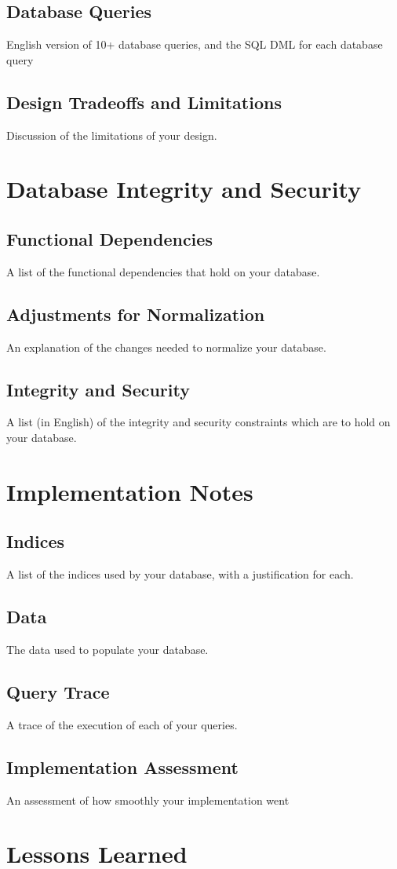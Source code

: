 \documentclass[11pt, a4paper]{report}
\begin{document}
\section{Database Queries}
    English version of 10+ database queries, and the SQL DML for each database query
\section{Design Tradeoffs and Limitations}
    Discussion of the limitations of your design.

\chapter{Database Integrity and Security}
\section{Functional Dependencies}
    A list of the functional dependencies that hold on your database.
\section{Adjustments for Normalization}
    An explanation of the changes needed to normalize your database.
\section{Integrity and Security}
    A list (in English) of the integrity and security constraints which are to hold on your database.

\chapter{Implementation Notes}
\section{Indices}
    A list of the indices used by your database, with a justification for each.
\section{Data}
    The data used to populate your database.
\section{Query Trace}
    A trace of the execution of each of your queries.
\section{Implementation Assessment}
    An assessment of how smoothly your implementation went

\chapter{Lessons Learned}
\end{document}
